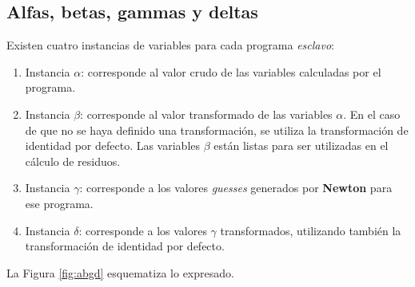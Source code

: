 \subsection*{Alfas, betas, gammas y deltas}
\label{ap1:abgd}

Existen cuatro instancias de variables para cada programa \textit{esclavo}:
\begin{enumerate}
\item Instancia $\alpha$: corresponde al valor crudo de las variables calculadas por el programa.
\item Instancia $\beta$: corresponde al valor transformado de las variables $\alpha$.
En el caso de que no se haya definido una transformación, se utiliza la transformación de identidad por defecto.
Las variables $\beta$ están listas para ser utilizadas en el cálculo de residuos.
\item Instancia $\gamma$: corresponde a los valores \textit{guesses} generados por \textbf{Newton} para ese programa.
\item Instancia $\delta$: corresponde a los valores $\gamma$ transformados, utilizando también la transformación de identidad por defecto.
\end{enumerate}
La Figura \ref{fig:abgd} esquematiza lo expresado.

